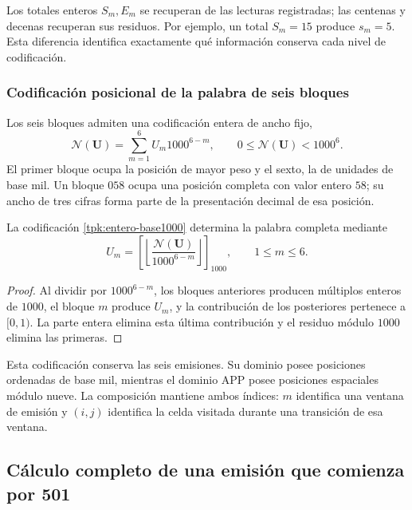 Los totales enteros \(S_m,E_m\) se recuperan de las lecturas registradas;
las centenas y decenas recuperan sus residuos. Por ejemplo, un total
\(S_m=15\) produce \(s_m=5\). Esta diferencia identifica exactamente
qué información conserva cada nivel de codificación.

\subsubsection{Codificación posicional de la palabra de seis bloques}

Los seis bloques admiten una codificación entera de ancho fijo,
\begin{equation}
 \mathscr N(\mathbf U)=\sum_{m=1}^{6}U_m1000^{6-m},
 \qquad0\leq\mathscr N(\mathbf U)<1000^6.
 \label{tpk:entero-base1000}
\end{equation}
El primer bloque ocupa la posición de mayor peso y el sexto, la de unidades
de base mil. Un bloque \(058\) ocupa una posición completa con valor
entero \(58\); su ancho de tres cifras forma parte de la presentación
decimal de esa posición.

\begin{proposicion}
\label{tpk:inversa-base1000}
La codificación \eqref{tpk:entero-base1000} determina la palabra completa
mediante
\[
 U_m=\left[\left\lfloor
 \frac{\mathscr N(\mathbf U)}{1000^{6-m}}\right\rfloor\right]_{1000},
 \qquad1\leq m\leq6.
\]
\end{proposicion}
\begin{proof}
Al dividir por \(1000^{6-m}\), los bloques anteriores producen múltiplos
enteros de \(1000\), el bloque \(m\) produce \(U_m\), y la contribución
de los posteriores pertenece a \([0,1)\). La parte entera elimina esta
última contribución y el residuo módulo \(1000\) elimina las primeras.
\end{proof}

Esta codificación conserva las seis emisiones. Su dominio posee posiciones
ordenadas de base mil, mientras el dominio APP posee posiciones espaciales
módulo nueve. La composición mantiene ambos índices: \(m\) identifica una
ventana de emisión y \((i,j)\) identifica la celda visitada durante una
transición de esa ventana.

\subsection{Cálculo completo de una emisión que comienza por 501}
\label{tpk:ejemplo501}

